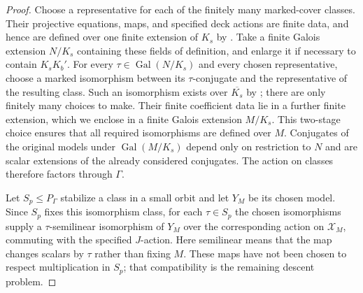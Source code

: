 \begin{proof}
Choose a representative for each of the finitely many marked-cover
classes.  Their projective equations, maps, and specified deck actions
are finite data, and hence are defined over one finite extension of
$K_s$ by .  Take a finite Galois extension
$N/K_s$ containing these fields of definition, and enlarge it if necessary
to contain $K_sK_b'$.  For every $\tau\in\operatorname{Gal}(N/K_s)$
and every chosen representative, choose a marked isomorphism between
its $\tau$-conjugate and the representative of the resulting class.
Such an isomorphism exists over $\overline{K_s}$ by
; there are only finitely many
choices to make.  Their finite coefficient data lie in a further
finite extension, which we enclose in a finite Galois extension $M/K_s$.
This two-stage choice ensures that all required isomorphisms are
defined over $M$.  Conjugates of the original models under
$\operatorname{Gal}(M/K_s)$ depend only on restriction to $N$ and are
scalar extensions of the already considered conjugates.  The action
on classes therefore factors through $\Gamma$.

Let $S_p\leq P_\Gamma$ stabilize a class in a small orbit and let $Y_M$
be its chosen model. Since $S_p$ fixes this isomorphism class, for each
$\tau\in S_p$ the chosen isomorphisms supply a $\tau$-semilinear
isomorphism of $Y_M$ over the corresponding action on $\mathcal X_M$,
commuting with the specified $J$-action. Here semilinear means that the
map changes scalars by $\tau$ rather than fixing $M$. These maps have
not been chosen to respect multiplication in $S_p$; that compatibility
is the remaining descent problem.


\end{proof}
